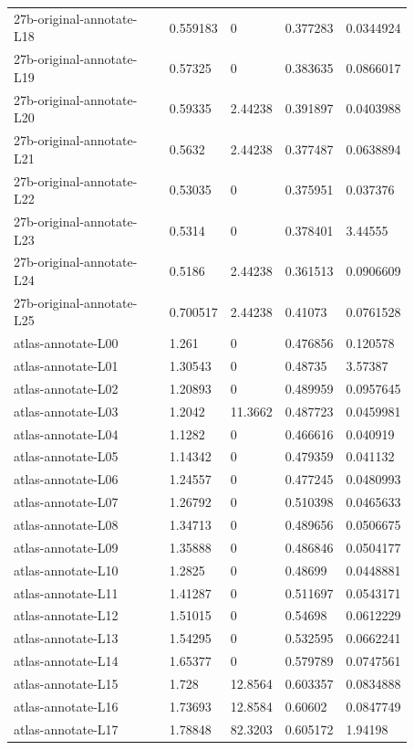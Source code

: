\begin{longtable}{@{}L{0.39\linewidth}L{0.11\linewidth}L{0.12\linewidth}L{0.12\linewidth}L{0.13\linewidth}@{}}
27b-original-annotate-L18 & 0.559183 & 0 & 0.377283 & 0.0344924 \\
27b-original-annotate-L19 & 0.57325 & 0 & 0.383635 & 0.0866017 \\
27b-original-annotate-L20 & 0.59335 & 2.44238 & 0.391897 & 0.0403988 \\
27b-original-annotate-L21 & 0.5632 & 2.44238 & 0.377487 & 0.0638894 \\
27b-original-annotate-L22 & 0.53035 & 0 & 0.375951 & 0.037376 \\
27b-original-annotate-L23 & 0.5314 & 0 & 0.378401 & 3.44555 \\
27b-original-annotate-L24 & 0.5186 & 2.44238 & 0.361513 & 0.0906609 \\
27b-original-annotate-L25 & 0.700517 & 2.44238 & 0.41073 & 0.0761528 \\
atlas-annotate-L00 & 1.261 & 0 & 0.476856 & 0.120578 \\
atlas-annotate-L01 & 1.30543 & 0 & 0.48735 & 3.57387 \\
atlas-annotate-L02 & 1.20893 & 0 & 0.489959 & 0.0957645 \\
atlas-annotate-L03 & 1.2042 & 11.3662 & 0.487723 & 0.0459981 \\
atlas-annotate-L04 & 1.1282 & 0 & 0.466616 & 0.040919 \\
atlas-annotate-L05 & 1.14342 & 0 & 0.479359 & 0.041132 \\
atlas-annotate-L06 & 1.24557 & 0 & 0.477245 & 0.0480993 \\
atlas-annotate-L07 & 1.26792 & 0 & 0.510398 & 0.0465633 \\
atlas-annotate-L08 & 1.34713 & 0 & 0.489656 & 0.0506675 \\
atlas-annotate-L09 & 1.35888 & 0 & 0.486846 & 0.0504177 \\
atlas-annotate-L10 & 1.2825 & 0 & 0.48699 & 0.0448881 \\
atlas-annotate-L11 & 1.41287 & 0 & 0.511697 & 0.0543171 \\
atlas-annotate-L12 & 1.51015 & 0 & 0.54698 & 0.0612229 \\
atlas-annotate-L13 & 1.54295 & 0 & 0.532595 & 0.0662241 \\
atlas-annotate-L14 & 1.65377 & 0 & 0.579789 & 0.0747561 \\
atlas-annotate-L15 & 1.728 & 12.8564 & 0.603357 & 0.0834888 \\
atlas-annotate-L16 & 1.73693 & 12.8584 & 0.60602 & 0.0847749 \\
atlas-annotate-L17 & 1.78848 & 82.3203 & 0.605172 & 1.94198 \\

\end{longtable}
